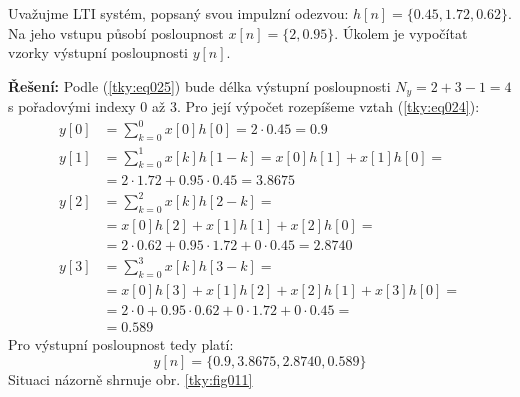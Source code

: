 \begin{mdframed}[style=mdexam]
  \begin{example}\label{tky:exam001}
    Uvažujme LTI systém, popsaný svou impulzní odezvou: \(h[n] = \{0.45, 1.72, 0.62\}\). Na jeho
    vstupu působí posloupnost \(x[n] = \{2,  0.95\}\). Úkolem  je vypočítat vzorky výstupní
    posloupnosti \(y[n]\).

    \noindent\textbf{Řešení:} Podle (\ref{tky:eq025}) bude délka výstupní posloupnosti \(N_y = 2 + 3
    - 1= 4\) s pořadovými indexy 0 až 3. Pro její výpočet rozepíšeme vztah (\ref{tky:eq024}):
    \begin{align*}
      y[0] &= \sum_{k=0}^0 x[0]h[0] = \num{2}\cdot\num{0.45} = \num{0.9}                   \\
      y[1] &= \sum_{k=0}^1 x[k]h[1-k] = x[0]h[1] + x[1]h[0] =                              \\
           &=  \num{2}\cdot\num{1.72} + \num{0.95}\cdot\num{0.45} = \num{3.8675}           \\
      y[2] &= \sum_{k=0}^2 x[k]h[2-k] =                                                    \\
           &= x[0]h[2] + x[1]h[1] + x[2]h[0] =                                             \\
           &= \num{2}\cdot\num{0.62} + \num{0.95}\cdot\num{1.72} + \num{0}\cdot\num{0.45}  
            = \num{2.8740}                                                                 \\
      y[3] &= \sum_{k=0}^3 x[k]h[3-k] =                                                    \\
           &= x[0]h[3] + x[1]h[2] + x[2]h[1] +  x[3]h[0] =                                 \\
           &= \num{2}\cdot\num{0} + \num{0.95}\cdot\num{0.62} + \num{0}\cdot\num{1.72}
            + \num{0}\cdot\num{0.45} =                                                     \\
           &= \num{0.589} 
    \end{align*} 
    Pro výstupní posloupnost tedy platí:
    \begin{equation*}
      y[n] = \{\num{0.9}, \num{3.8675}, \num{2.8740}, \num{0.589}\}
    \end{equation*}
    Situaci názorně shrnuje obr. \ref{tky:fig011}


\end{example}
\end{mdframed}
